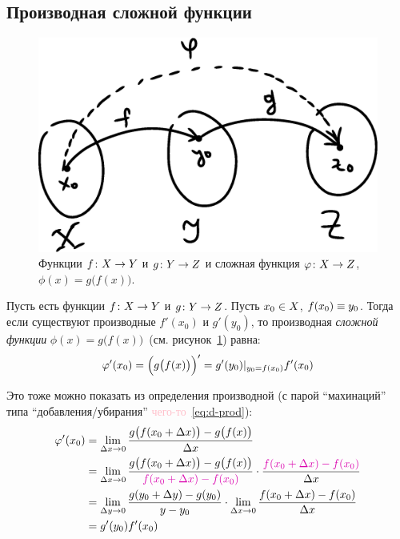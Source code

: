 \documentclass[a4paper,12pt]{article}
\begin{document}
  
  \subsection{Производная сложной функции}
  
  \begin{figure}[ht]
    \centering
    \includegraphics[width=0.6\linewidth]{images/X-Y-Z}
    
    \caption{
      Функции $f\colon X \hm\to Y$ и $g\colon Y \hm\to Z$ и сложная функция $\phi\colon X \hm\to Z$, $\phi(x) = g\bigl(f(x)\bigr)$.
    }
    \label{fig:x-y-z}
  \end{figure}
  
  Пусть есть функции $f\colon X \hm\to Y$ и $g\colon Y \hm\to Z$.
  Пусть $x_0 \hm\in X$, $f(x_0) \hm\equiv y_0$.
  Тогда если существуют производные $f'(x_0)$ и $g'(y_0)$, то производная \emph{сложной функции} $\phi(x) = g\bigl(f(x)\bigr)$~(см. рисунок~\ref{fig:x-y-z}) равна:
  \begin{equation}
    \phi'(x_0) = \Bigl(g\bigl(f(x)\bigr)\Bigr)' = g'(y_0)|_{y_0 = f(x_0)} f'(x_0)
  \end{equation}
  
  Это тоже можно показать из определения производной (с парой ``махинаций'' типа ``добавления/убирания'' \textcolor{pink}{чего-то}~\eqref{eq:d-prod}):
  \begin{equation*}
  \begin{split}
    \phi'(x_0) &= \lim_{\Dt x \to 0} \frac{g\bigl(f(x_0 + \Dt x)\bigr) - g\bigl(f(x)\bigr)}{\Dt x}\\
      &= \lim_{\Dt x \to 0} \frac{g\bigl(f(x_0 + \Dt x)\bigr) - g\bigl(f(x)\bigr)}{\textcolor{pink}{f(x_0 + \Dt x) - f(x_0)}} \cdot \frac{\textcolor{pink}{f(x_0 + \Dt x) - f(x_0)}}{\Dt x}\\
      &= \lim_{\Dt y \to 0} \frac{g(y_0 + \Dt y) - g(y_0)}{y - y_0} \cdot \lim_{\Dt x \to 0} \frac{f(x_0 + \Dt x) - f(x_0)}{\Dt x}\\
      &= g'(y_0) f'(x_0)
  \end{split}
  \end{equation*}
  
\end{document}
